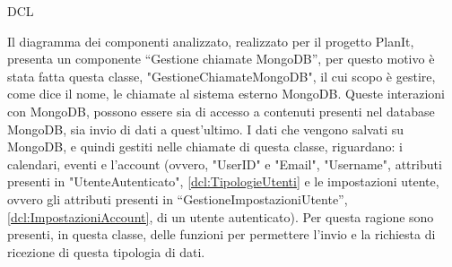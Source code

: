 \begin{listaPersonale}{DCL}
    \begin{center}
        
    \end{center}



    Il diagramma dei componenti analizzato, realizzato per il progetto PlanIt, presenta un componente “Gestione chiamate MongoDB”, per questo motivo è stata fatta questa classe, "GestioneChiamateMongoDB", il cui scopo è gestire, come dice il nome, le chiamate al sistema esterno MongoDB. Queste interazioni con MongoDB, possono essere sia di accesso a contenuti presenti nel database MongoDB, sia invio di dati a quest'ultimo. I dati che vengono salvati su MongoDB, e quindi gestiti nelle chiamate di questa classe, riguardano: i calendari, eventi e l'account (ovvero, "UserID" e "Email", "Username", attributi presenti in "UtenteAutenticato", \ref{dcl:TipologieUtenti} e le impostazioni utente, ovvero gli attributi presenti in “GestioneImpostazioniUtente”, \ref{dcl:ImpostazioniAccount}, di un utente autenticato). Per questa ragione sono presenti, in questa classe, delle funzioni per permettere l'invio e la richiesta di ricezione di questa tipologia di dati.


    \begin{center}
        
    \end{center}



\end{listaPersonale}
